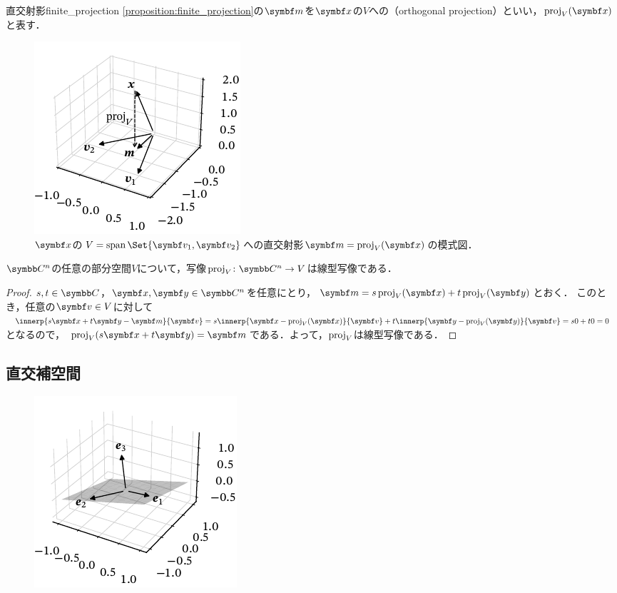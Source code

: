 \documentclass[../../main]{subfiles}
\begin{document}
\begin{definition}{直交射影}{finite_projection}
  \cref{proposition:finite_projection}の\(\vect{m}\)を\(\vect{x}\)の\(V\)への（orthogonal projection）といい，\(\proj_V(\vect{x})\)と表す．
\end{definition}

\begin{figure}[htbp]
  \centering
  \includegraphics{proj3d.pdf}
  \caption{\(\vect{x}\)の\(V=\spannedby\Set{\vect{v}_1,\vect{v}_2}\)への直交射影\(\vect{m}=\proj_V(\vect{x})\)の模式図．}
\end{figure}

\begin{proposition}{}{}
  \(\numset{C}^n\)の任意の部分空間\(V\)について，写像\(\proj_V\colon\numset{C}^n\to V\)は線型写像である．
\end{proposition}

\begin{proof}
  \(s,t\in\numset{C}\)，\(\vect{x},\vect{y}\in\numset{C}^n\)を任意にとり，\(\vect{m}=s\proj_V(\vect{x})+t\proj_V(\vect{y})\)とおく．
  このとき，任意の\(\vect{v}\in V\)に対して\(\innerp{s\vect{x}+t\vect{y}-\vect{m}}{\vect{v}}=s\innerp{\vect{x}-\proj_V(\vect{x})}{\vect{v}}+t\innerp{\vect{y}-\proj_V(\vect{y})}{\vect{v}}=s0+t0=0\)となるので，
  \(\proj_V(s\vect{x}+t\vect{y})=\vect{m}\)である．よって，\(\operatorname{proj}_V\)は線型写像である．
\end{proof}

\subsection{直交補空間}
\begin{figure}[htbp]
  \centering
  \includegraphics{orthogonal_complement.pdf}
\end{figure}
\end{document}
